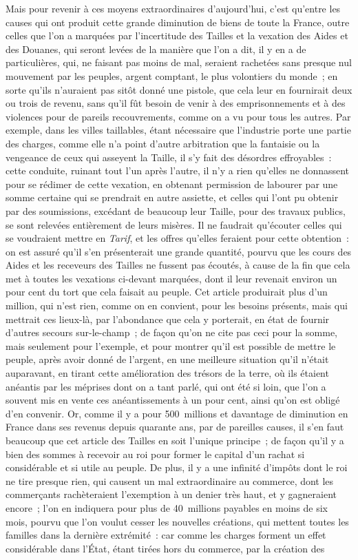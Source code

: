 \documentclass[french,twoside]{book} %
\begin{document}
Mais pour revenir à ces moyens extraordinaires d’aujourd’hui, c’est qu’entre les causes qui ont produit cette grande diminution de biens de toute la France, outre celles que l’on a marquées par l’incertitude des Tailles et la vexation des Aides et des Douanes, qui seront levées de la manière que l’on a dit, il y en a de particulières, qui, ne faisant pas moins de mal, seraient rachetées sans presque nul mouvement par les peuples, argent comptant, le plus volontiers du monde ; en sorte qu’ils n’auraient pas sitôt donné une pistole, que cela leur en fournirait deux ou trois de revenu, sans qu’il fût besoin de venir à des emprisonnements et à des violences pour de pareils recouvrements, comme on a vu pour tous les autres. Par exemple, dans les villes taillables, étant nécessaire que l’industrie porte une partie des charges, comme elle n’a point d’autre arbitration que la fantaisie ou la vengeance de ceux qui asseyent la Taille, il s’y fait des désordres effroyables : cette conduite, ruinant tout l’un après l’autre, il n’y a rien qu’elles ne donnassent pour se rédimer de cette vexation, en obtenant permission de labourer par une somme certaine qui se prendrait en autre assiette, et celles qui l’ont pu obtenir par des soumissions, excédant de beaucoup leur Taille, pour des travaux publics, se sont relevées entièrement de leurs misères. Il ne faudrait qu’écouter celles qui se voudraient mettre en {\itshape Tarif}, et les offres qu’elles feraient pour cette obtention : on est assuré qu’il s’en présenterait une grande quantité, pourvu que les cours des Aides et les receveurs des Tailles ne fussent pas écoutés, à cause de la fin que cela met à toutes les vexations ci-devant marquées, dont il leur revenait environ un pour cent du tort que cela faisait au peuple. Cet article produirait plus d’un million, qui n’est rien, comme on en convient, pour les besoins présents, mais qui mettrait ces lieux-là, par l’abondance que cela y porterait, en état de fournir d’autres secours sur-le-champ ; de façon qu’on ne cite pas ceci pour la somme, mais seulement pour l’exemple, et pour montrer qu’il est possible de mettre le peuple, après avoir donné de l’argent, en une meilleure situation qu’il n’était auparavant, en tirant cette amélioration des trésors de la terre, où ils étaient anéantis par les méprises dont on a tant parlé, qui ont été si loin, que l’on a souvent mis en vente ces anéantissements à un pour cent, ainsi qu’on est obligé d’en convenir. Or, comme il y a pour 500 millions et davantage de diminution en France dans ses revenus depuis quarante ans, par de pareilles causes, il s’en faut beaucoup que cet article des Tailles en soit l’unique principe ; de façon qu’il y a bien des sommes à recevoir au roi pour former le capital d’un rachat si considérable et si utile au peuple. De plus, il y a une infinité d’impôts dont le roi ne tire presque rien, qui causent un mal extraordinaire au commerce, dont les commerçants rachèteraient l’exemption à un denier très haut, et y gagneraient encore ; l’on en indiquera pour plus de 40 millions payables en moins de six mois, pourvu que l’on voulut cesser les nouvelles créations, qui mettent toutes les familles dans la dernière extrémité : car comme les charges forment un effet considérable dans l’État, étant tirées hors du commerce, par la création des 
\end{document}
